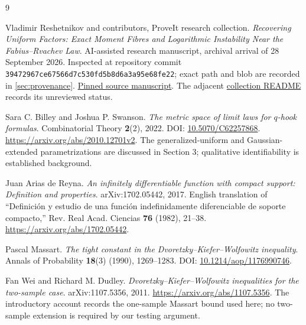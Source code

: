 \documentclass[11pt,a4paper]{article}
\numberwithin{equation}{section}
\theoremstyle{definition}
\theoremstyle{remark}
\newcommand{\repoSHA}{39472967ce67566d7c530fd5b8d6a3a95e68fe22}
\begin{document}
\begin{thebibliography}{9}
\small\raggedright

Vladimir Reshetnikov and contributors, ProveIt research collection.
\emph{Recovering Uniform Factors: Exact Moment Fibres and Logarithmic
Instability Near the Fabius--Rvachev Law}.
AI-assisted research manuscript, archival arrival of 28 September 2026.
Inspected at repository commit \texttt{\repoSHA}; exact path and blob are
recorded in \cref{sec:provenance}.
\href{https://github.com/VladimirReshetnikov/ProveIt/blob/39472967ce67566d7c530fd5b8d6a3a95e68fe22/Analysis/FabiusFunction/docs/semi-formalized-research-frontiers/drafts/inverse-and-sampling/Recovering_Uniform_Factors_Fabius_Rvachev/article.tex}{Pinned source manuscript}.
The adjacent \href{https://github.com/VladimirReshetnikov/ProveIt/blob/39472967ce67566d7c530fd5b8d6a3a95e68fe22/Analysis/FabiusFunction/docs/semi-formalized-research-frontiers/drafts/inverse-and-sampling/README.md}{collection README}
records its unreviewed status.

Sara C. Billey and Joshua P. Swanson.
\emph{The metric space of limit laws for $q$-hook formulas}.
Combinatorial Theory \textbf{2}(2), 2022.
DOI: \href{https://doi.org/10.5070/C62257868}{10.5070/C62257868}.
\url{https://arxiv.org/abs/2010.12701v2}.
The generalized-uniform and Gaussian-extended parametrizations are discussed
in Section 3; qualitative identifiability is established background.

Juan Arias de Reyna.
\emph{An infinitely differentiable function with compact support:
Definition and properties}.
arXiv:1702.05442, 2017.
English translation of ``Definici\'on y estudio de una funci\'on
indefinidamente diferenciable de soporte compacto,''
Rev. Real Acad. Ciencias \textbf{76} (1982), 21--38.
\url{https://arxiv.org/abs/1702.05442}.

Pascal Massart.
\emph{The tight constant in the Dvoretzky--Kiefer--Wolfowitz inequality}.
Annals of Probability \textbf{18}(3) (1990), 1269--1283.
DOI: \href{https://doi.org/10.1214/aop/1176990746}{10.1214/aop/1176990746}.

Fan Wei and Richard M. Dudley.
\emph{Dvoretzky--Kiefer--Wolfowitz inequalities for the two-sample case}.
arXiv:1107.5356, 2011.
\url{https://arxiv.org/abs/1107.5356}.
The introductory account records the one-sample Massart bound used here;
no two-sample extension is required by our testing argument.

\end{thebibliography}
\end{document}

